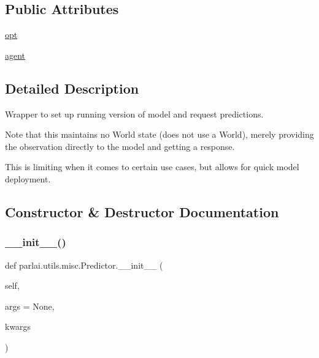 \subsection*{Public Attributes}
\begin{DoxyCompactItemize}
\item 
\hyperlink{classparlai_1_1utils_1_1misc_1_1Predictor_a608b3d7f6722389f3a7eeed0ec5772b7}{opt}
\item 
\hyperlink{classparlai_1_1utils_1_1misc_1_1Predictor_a0ea35fd562c6edaa6affd03006f1bd08}{agent}
\end{DoxyCompactItemize}


\subsection{Detailed Description}
\begin{DoxyVerb}Wrapper to set up running version of model and request predictions.

Note that this maintains no World state (does not use a World), merely
providing the observation directly to the model and getting a response.

This is limiting when it comes to certain use cases, but allows for quick
model deployment.
\end{DoxyVerb}
 

\subsection{Constructor \& Destructor Documentation}
\mbox{\label{classparlai_1_1utils_1_1misc_1_1Predictor_a40aaf55870ba3c02fc2bff2ef5d2a9b7}} 
\subsubsection{\texorpdfstring{\+\_\+\+\_\+init\+\_\+\+\_\+()}{\_\_init\_\_()}}
{\footnotesize\ttfamily def parlai.\+utils.\+misc.\+Predictor.\+\_\+\+\_\+init\+\_\+\+\_\+ (\begin{DoxyParamCaption}\item[{}]{self,  }\item[{}]{args = {\ttfamily None},  }\item[{}]{kwargs }\end{DoxyParamCaption})}

